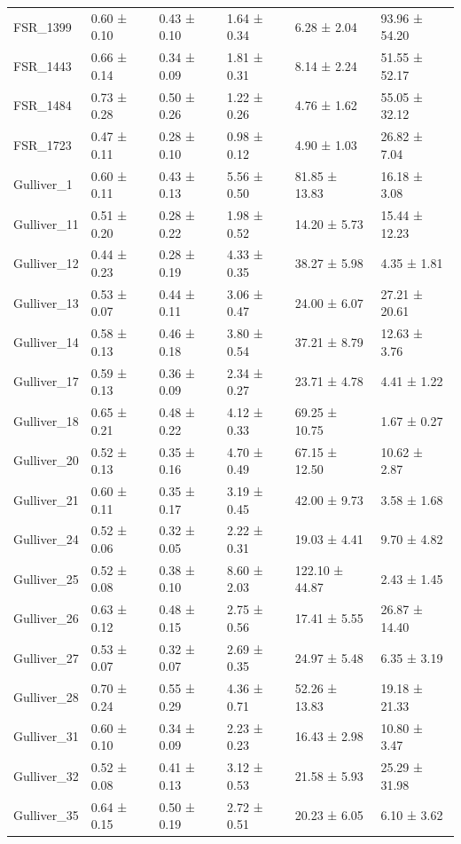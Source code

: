 \begin{tabular}{llllll}
FSR_1399 & 0.60 ± 0.10 & 0.43 ± 0.10 & 1.64 ± 0.34 & 6.28 ± 2.04 & 93.96 ± 54.20 \\
FSR_1443 & 0.66 ± 0.14 & 0.34 ± 0.09 & 1.81 ± 0.31 & 8.14 ± 2.24 & 51.55 ± 52.17 \\
FSR_1484 & 0.73 ± 0.28 & 0.50 ± 0.26 & 1.22 ± 0.26 & 4.76 ± 1.62 & 55.05 ± 32.12 \\
FSR_1723 & 0.47 ± 0.11 & 0.28 ± 0.10 & 0.98 ± 0.12 & 4.90 ± 1.03 & 26.82 ± 7.04 \\
Gulliver_1 & 0.60 ± 0.11 & 0.43 ± 0.13 & 5.56 ± 0.50 & 81.85 ± 13.83 & 16.18 ± 3.08 \\
Gulliver_11 & 0.51 ± 0.20 & 0.28 ± 0.22 & 1.98 ± 0.52 & 14.20 ± 5.73 & 15.44 ± 12.23 \\
Gulliver_12 & 0.44 ± 0.23 & 0.28 ± 0.19 & 4.33 ± 0.35 & 38.27 ± 5.98 & 4.35 ± 1.81 \\
Gulliver_13 & 0.53 ± 0.07 & 0.44 ± 0.11 & 3.06 ± 0.47 & 24.00 ± 6.07 & 27.21 ± 20.61 \\
Gulliver_14 & 0.58 ± 0.13 & 0.46 ± 0.18 & 3.80 ± 0.54 & 37.21 ± 8.79 & 12.63 ± 3.76 \\
Gulliver_17 & 0.59 ± 0.13 & 0.36 ± 0.09 & 2.34 ± 0.27 & 23.71 ± 4.78 & 4.41 ± 1.22 \\
Gulliver_18 & 0.65 ± 0.21 & 0.48 ± 0.22 & 4.12 ± 0.33 & 69.25 ± 10.75 & 1.67 ± 0.27 \\
Gulliver_20 & 0.52 ± 0.13 & 0.35 ± 0.16 & 4.70 ± 0.49 & 67.15 ± 12.50 & 10.62 ± 2.87 \\
Gulliver_21 & 0.60 ± 0.11 & 0.35 ± 0.17 & 3.19 ± 0.45 & 42.00 ± 9.73 & 3.58 ± 1.68 \\
Gulliver_24 & 0.52 ± 0.06 & 0.32 ± 0.05 & 2.22 ± 0.31 & 19.03 ± 4.41 & 9.70 ± 4.82 \\
Gulliver_25 & 0.52 ± 0.08 & 0.38 ± 0.10 & 8.60 ± 2.03 & 122.10 ± 44.87 & 2.43 ± 1.45 \\
Gulliver_26 & 0.63 ± 0.12 & 0.48 ± 0.15 & 2.75 ± 0.56 & 17.41 ± 5.55 & 26.87 ± 14.40 \\
Gulliver_27 & 0.53 ± 0.07 & 0.32 ± 0.07 & 2.69 ± 0.35 & 24.97 ± 5.48 & 6.35 ± 3.19 \\
Gulliver_28 & 0.70 ± 0.24 & 0.55 ± 0.29 & 4.36 ± 0.71 & 52.26 ± 13.83 & 19.18 ± 21.33 \\
Gulliver_31 & 0.60 ± 0.10 & 0.34 ± 0.09 & 2.23 ± 0.23 & 16.43 ± 2.98 & 10.80 ± 3.47 \\
Gulliver_32 & 0.52 ± 0.08 & 0.41 ± 0.13 & 3.12 ± 0.53 & 21.58 ± 5.93 & 25.29 ± 31.98 \\
Gulliver_35 & 0.64 ± 0.15 & 0.50 ± 0.19 & 2.72 ± 0.51 & 20.23 ± 6.05 & 6.10 ± 3.62 \\

\end{tabular}
